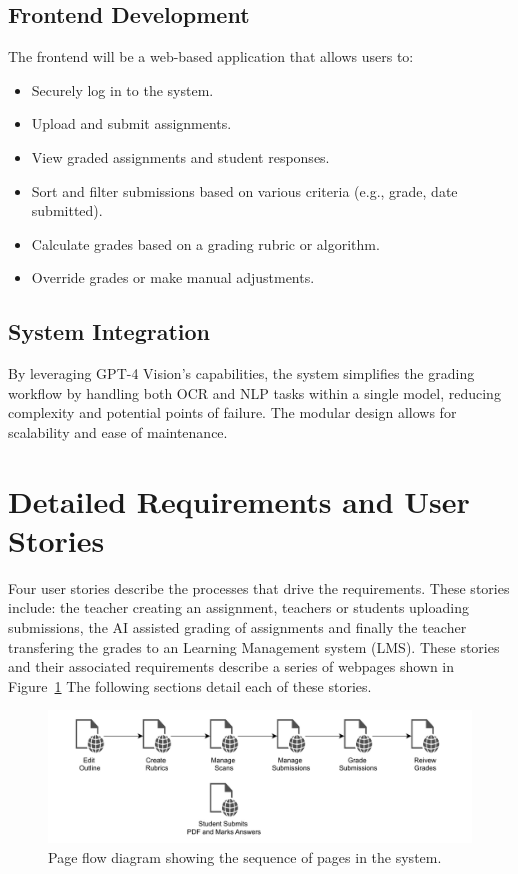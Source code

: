 \documentclass[ms,twoside,print]{nuthesis}
\begin{document}
\subsection{Frontend Development}

The frontend will be a web-based application that allows users to:

\begin{itemize}
    \item Securely log in to the system.
    \item Upload and submit assignments. %
    \item View graded assignments and student responses.
    \item Sort and filter submissions based on various criteria (e.g., grade, date submitted).
    \item Calculate grades based on a grading rubric or algorithm.
    \item Override grades or make manual adjustments.
\end{itemize}

\subsection{System Integration}

By leveraging GPT-4 Vision's capabilities, the system simplifies the grading workflow by handling both OCR and NLP tasks within a single model, reducing complexity and potential points of failure. The modular design allows for scalability and ease of maintenance.

\section{Detailed Requirements and User Stories}

Four user stories describe the processes that drive the requirements. These stories include: the teacher creating an assignment, teachers or students uploading submissions, the AI assisted grading of assignments and finally the teacher transfering the grades to an Learning Management system (LMS). These stories and their associated requirements describe a series of webpages shown in Figure~\ref{fig:page-flow}  The following sections detail each of these stories.

\begin{figure}[h]
    \centering
    \includegraphics[width=.95\textwidth]{images/page-flow.pdf}
    \caption{Page flow diagram showing the sequence of pages in the system.}
    \label{fig:page-flow}
\end{figure}
\end{document}
